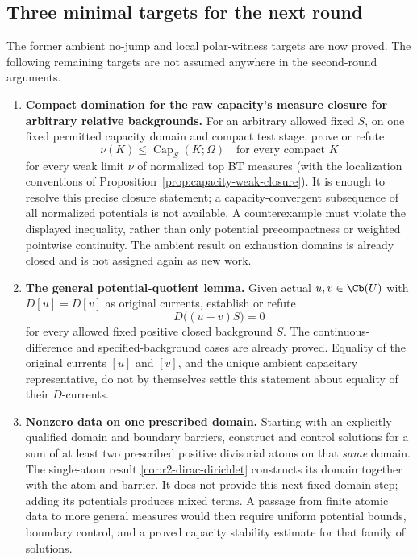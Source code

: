\subsection{Three minimal targets for the next round}

The former ambient no-jump and local polar-witness targets are now
proved. The following remaining targets are not assumed anywhere in
the second-round arguments.

\begin{enumerate}
\item \textbf{Compact domination for the raw capacity's measure
closure for arbitrary relative backgrounds.} For an arbitrary allowed
fixed $S$, on one fixed permitted capacity domain and compact test
stage, prove or refute
\[
 \nu(K)\leq\operatorname{Cap}_S(K;\Omega)
 \quad\text{for every compact }K
\]
for every weak limit $\nu$ of normalized top BT measures (with the
localization conventions of
Proposition~\ref{prop:capacity-weak-closure}). It is enough to resolve
this precise closure statement; a capacity-convergent subsequence of
all normalized potentials is not available. A counterexample must
violate the displayed inequality, rather than only potential
precompactness or weighted pointwise continuity. The ambient result
on exhaustion domains is already closed and is not assigned again
as new work.

\item \textbf{The general potential-quotient lemma.} Given actual
$u,v\in\Cb(U)$ with $D[u]=D[v]$ as original currents, establish
or refute
\[
 D\bigl((u-v)S\bigr)=0
\]
for every allowed fixed positive closed background $S$.
The continuous-difference and specified-background cases are already
proved. Equality of the original currents $[u]$ and $[v]$, and the
unique ambient capacitary representative, do not by themselves
settle this statement about equality of their $D$-currents.

\item \textbf{Nonzero data on one prescribed domain.} Starting with
an explicitly qualified domain and boundary barriers, construct and
control solutions for a sum of at least two prescribed positive
divisorial atoms on that \emph{same} domain. The single-atom result
\ref{cor:r2-dirac-dirichlet} constructs its domain together with the
atom and barrier. It does not provide this next fixed-domain step;
adding its potentials produces mixed terms. A passage from finite
atomic data to more general measures would then require uniform
potential bounds, boundary control, and a proved capacity stability
estimate for that family of solutions.
\end{enumerate}

